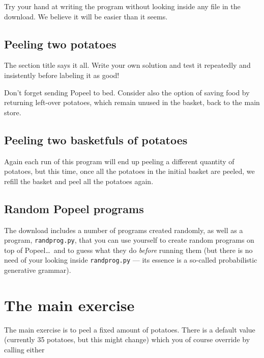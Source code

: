 \documentclass[12pt]{article}
\begin{document}
Try your hand at writing the program without looking
inside any file in the download. We believe it will 
be easier than it seems.

\subsection{Peeling two potatoes}

The section title says it all. 
Write your own solution and test it
repeatedly and insistently before labeling it
as good! 

Don't forget sending Popeel to bed.
Consider also the option of saving food by
returning left-over potatoes, which remain
unused in the basket, back to the main store.

\subsection{Peeling two basketfuls of potatoes}

Again each run of this program will end up peeling a 
different quantity of potatoes, but this time, once
all the potatoes in the initial basket are peeled,
we refill the basket and peel all the potatoes again.

\subsection{Random Popeel programs}

The download includes a number of programs created
randomly, as well as a program, {\tt randprog.py}, that
you can use yourself to create random programs on 
top of Popeel\dots\ and to guess what they do \emph{before}
running them (but there is no need of your looking 
inside {\tt randprog.py} --- its essence is a so-called
probabilistic generative grammar).

\section{The main exercise}

The main exercise is to peel a fixed amount of potatoes.
There is a default value (currently 35 potatoes, but 
this might change) which you of course override by
calling either
\end{document}

